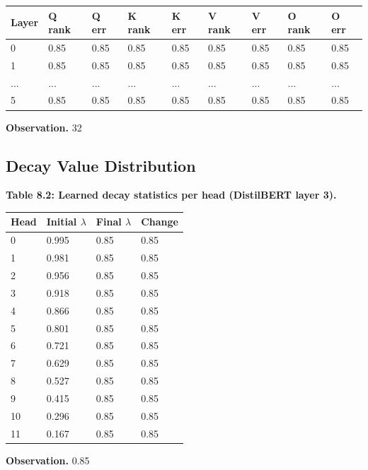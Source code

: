 \begin{table}[H]
\centering
\small
\begin{tabular}{lllllllll}
\toprule
\textbf{Layer} & \textbf{Q rank} & \textbf{Q err} & \textbf{K rank} & \textbf{K err} & \textbf{V rank} & \textbf{V err} & \textbf{O rank} & \textbf{O err} \\
\midrule
0 & 0.85 & 0.85 & 0.85 & 0.85 & 0.85 & 0.85 & 0.85 & 0.85 \\
1 & 0.85 & 0.85 & 0.85 & 0.85 & 0.85 & 0.85 & 0.85 & 0.85 \\
... & ... & ... & ... & ... & ... & ... & ... & ... \\
5 & 0.85 & 0.85 & 0.85 & 0.85 & 0.85 & 0.85 & 0.85 & 0.85 \\
\bottomrule
\end{tabular}
\end{table}

\textbf{Observation.} 32

\subsection{Decay Value Distribution}

\textbf{Table 8.2: Learned decay statistics per head (DistilBERT layer 3).}

\begin{table}[H]
\centering
\small
\begin{tabular}{llll}
\toprule
\textbf{Head} & \textbf{Initial $\lambda$} & \textbf{Final $\lambda$} & \textbf{Change} \\
\midrule
0 & 0.995 & 0.85 & 0.85 \\
1 & 0.981 & 0.85 & 0.85 \\
2 & 0.956 & 0.85 & 0.85 \\
3 & 0.918 & 0.85 & 0.85 \\
4 & 0.866 & 0.85 & 0.85 \\
5 & 0.801 & 0.85 & 0.85 \\
6 & 0.721 & 0.85 & 0.85 \\
7 & 0.629 & 0.85 & 0.85 \\
8 & 0.527 & 0.85 & 0.85 \\
9 & 0.415 & 0.85 & 0.85 \\
10 & 0.296 & 0.85 & 0.85 \\
11 & 0.167 & 0.85 & 0.85 \\
\bottomrule
\end{tabular}
\end{table}

\textbf{Observation.} 0.85

